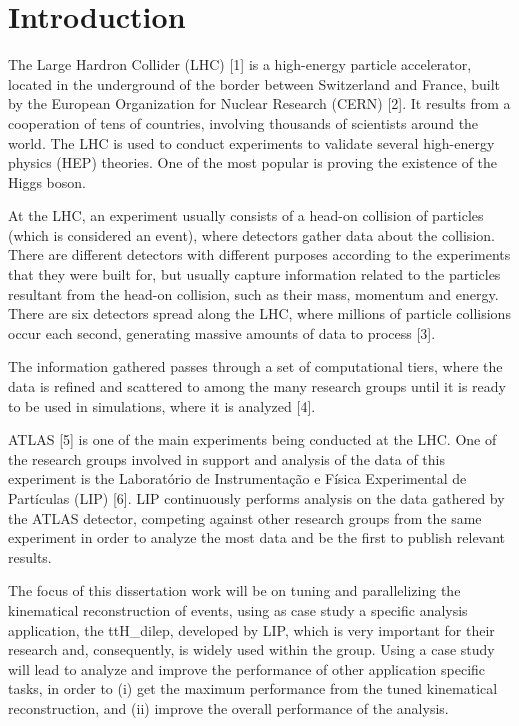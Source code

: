 
\chapter{Introduction}

The Large Hardron Collider (LHC) [1] is a high-energy particle accelerator, located in the underground of the border between Switzerland and France, built by the European Organization for Nuclear Research (CERN) [2]. It results from a cooperation of tens of countries, involving thousands of scientists around the world. The LHC is used to conduct experiments to validate several high-energy physics (HEP) theories. One of the most popular is proving the existence of the Higgs boson.

At the LHC, an experiment usually consists of a head-on collision of particles (which is considered an event), where detectors gather data about the collision. There are different detectors with different purposes according to the experiments that they were built for, but usually capture information related to the particles resultant from the head-on collision, such as their mass, momentum and energy. There are six detectors spread along the LHC, where millions of particle collisions occur each second, generating massive amounts of data to process [3].

The information gathered passes through a set of computational tiers, where the data is refined and scattered to among the many research groups until it is ready to be used in simulations, where it is analyzed [4].

ATLAS [5] is one of the main experiments being conducted at the LHC. One of the research groups involved in support and analysis of the data of this experiment is the Laboratório de Instrumentação e Física Experimental de Partículas (LIP) [6]. LIP continuously performs analysis on the data gathered by the ATLAS detector, competing against other research groups from the same experiment in order to analyze the most data and be the first to publish relevant results.

The focus of this dissertation work will be on tuning and parallelizing the kinematical reconstruction of events, using as case study a specific analysis application, the ttH\_dilep, developed by LIP, which is very important for their research and, consequently, is widely used within the group. Using a case study will lead to analyze and improve the performance of other application specific tasks, in order to (i) get the maximum performance from the tuned kinematical reconstruction, and (ii) improve the overall performance of the analysis.

